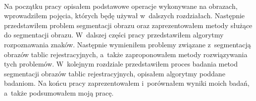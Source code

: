 \paragraph{}
Na początku pracy opisałem podstawowe operacje wykonywane na obrazach, wprowadziłem pojęcia, których będę używał w~dalszych rozdziałach. Następnie przedstawiłem problem segmentacji obrazu oraz zaprezentowałem metody służące do segmentacji obrazu. W~dalszej części pracy przedstawiłem algorytmy rozpoznawania znaków. Następnie wymieniłem problemy związane z~segmentacją obrazów tablic rejestracyjnych, a~także zaproponowałem metody rozwiązywania tych problemów. W~kolejnym rozdziale przedstawiłem proces badania metod segmentacji obrazów tablic rejestracyjnych, opisałem algorytmy poddane badaniom. Na końcu pracy zaprezentowałem i~porównałem wyniki moich badań, a~także podsumowałem moją pracę.
